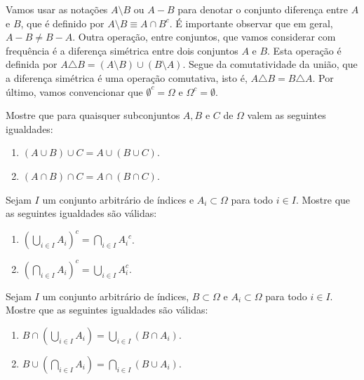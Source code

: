 Vamos usar as notações $A \setminus B$ ou $A-B$
para denotar o conjunto diferença entre $A$ e $B$,
que é definido por $A\setminus B\equiv  A \cap B^c$.
É importante observar que em geral, 
$A - B \neq B - A$.
Outra operação, entre conjuntos, que vamos 
considerar com frequência é 
a diferença simétrica entre dois conjuntos $A$ e $B$. 
Esta operação é definida por 
$A\triangle B = (A \setminus B) \cup (B\setminus A).$
Segue da comutatividade da união, 
que a diferença simétrica é uma operação comutativa,
isto é,  $A\triangle B = B\triangle A$.
Por último, vamos convencionar que 
$\emptyset^c = \Omega$ e $\Omega^c = \emptyset$.




\begin{exercicio}[Associatividade] 
Mostre que para quaisquer subconjuntos $A,B$ e $C$ 
de $\Omega$ valem as seguintes igualdades:
\begin{enumerate}
	\item $(A\cup B)\cup C= A \cup ( B \cup C)$.
	\item $(A\cap B)\cap C= A \cap ( B \cap C)$.
\end{enumerate}
\end{exercicio}






\begin{exercicio} 
Sejam $I$ um conjunto arbitrário de índices
e $A_i\subset \Omega$ para todo $i\in I$. Mostre que
as seguintes igualdades são válidas:
\begin{enumerate}
\item 
$
\left( \displaystyle\bigcup_{i \in I}{A_i} \right)^c 
= 
\displaystyle\bigcap_{i \in I}{{A_i}^c}
$.
\vspace*{0.3cm}
\item
$
\left( \displaystyle\bigcap_{i \in I}{A_i} \right)^c 
= 
\displaystyle\bigcup_{i \in I}{A_i^c}
$.
%
\end{enumerate}
\end{exercicio}





\begin{exercicio}[Distributiva] 
Sejam $I$ um conjunto arbitrário de índices, 
$B\subset \Omega$ e $A_i\subset \Omega$ para todo $i\in I$. 
Mostre que as seguintes igualdades são válidas:
%
\begin{enumerate}
\item 
$
B \cap \left( \displaystyle\bigcup_{i \in I}{A_i} \right) 
= 
\displaystyle\bigcup_{i \in I}{(B\cap A_i)} 
$.
%
\vspace*{0.3cm}
\item
$
B \cup \left( \displaystyle\bigcap_{i \in I}{A_i} \right) 
= 
\displaystyle\bigcap_{i \in I}{(B\cup A_i)} 
$.
\end{enumerate}
%
\end{exercicio}







